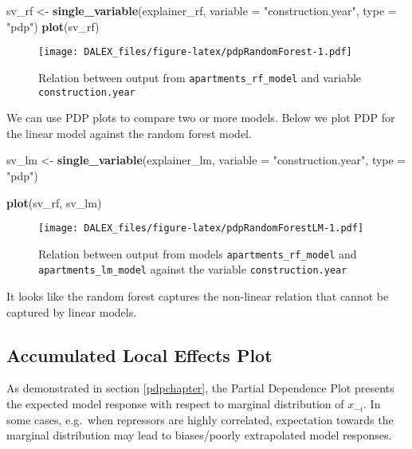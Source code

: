 \documentclass[]{book}
\newenvironment{Shaded}{\begin{snugshade}}{\end{snugshade}}
\newcommand{\DataTypeTok}[1]{\textcolor[rgb]{0.13,0.29,0.53}{#1}}
\newcommand{\KeywordTok}[1]{\textcolor[rgb]{0.13,0.29,0.53}{\textbf{#1}}}
\newcommand{\NormalTok}[1]{#1}
\newcommand{\StringTok}[1]{\textcolor[rgb]{0.31,0.60,0.02}{#1}}
\theoremstyle{definition}
\theoremstyle{definition}
\theoremstyle{definition}
\theoremstyle{remark}
\begin{document}
\begin{Shaded}
\begin{Highlighting}[]
\NormalTok{sv_rf  <-}\StringTok{ }\KeywordTok{single_variable}\NormalTok{(explainer_rf, }\DataTypeTok{variable =}  \StringTok{"construction.year"}\NormalTok{, }\DataTypeTok{type =} \StringTok{"pdp"}\NormalTok{)}
\KeywordTok{plot}\NormalTok{(sv_rf)}
\end{Highlighting}
\end{Shaded}

\begin{figure}
\centering
\texttt{[image: DALEX\_files/figure-latex/pdpRandomForest-1.pdf]}
\caption{\label{fig:pdpRandomForest}Relation between output from
\texttt{apartments\_rf\_model} and variable \texttt{construction.year}}
\end{figure}

We can use PDP plots to compare two or more models. Below we plot PDP
for the linear model against the random forest model.

\begin{Shaded}
\begin{Highlighting}[]
\NormalTok{sv_lm  <-}\StringTok{ }\KeywordTok{single_variable}\NormalTok{(explainer_lm, }\DataTypeTok{variable =}  \StringTok{"construction.year"}\NormalTok{, }\DataTypeTok{type =} \StringTok{"pdp"}\NormalTok{)}

\KeywordTok{plot}\NormalTok{(sv_rf, sv_lm)}
\end{Highlighting}
\end{Shaded}

\begin{figure}
\centering
\texttt{[image: DALEX\_files/figure-latex/pdpRandomForestLM-1.pdf]}
\caption{\label{fig:pdpRandomForestLM}Relation between output from models
\texttt{apartments\_rf\_model} and \texttt{apartments\_lm\_model}
against the variable \texttt{construction.year}}
\end{figure}

It looks like the random forest captures the non-linear relation that
cannot be captured by linear models.

\hypertarget{accumulatedLocalEffects}{%
\subsection{Accumulated Local Effects
Plot}\label{accumulatedLocalEffects}}

As demonstrated in section \ref{pdpchapter}, the Partial Dependence Plot
presents the expected model response with respect to marginal
distribution of \(x_{-i}\). In some cases, e.g.~when repressors are
highly correlated, expectation towards the marginal distribution may
lead to biases/poorly extrapolated model responses.
\end{document}
